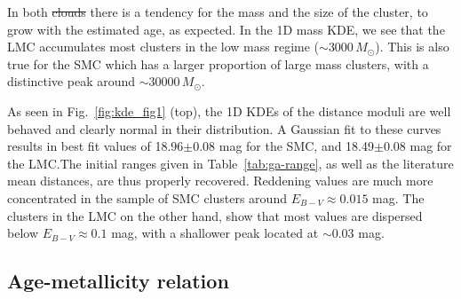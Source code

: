 \documentclass[draft]{aa}
\providecommand{\DIFaddtex}[1]{{\protect\color{blue}\uwave{#1}}} %
\providecommand{\DIFdeltex}[1]{{\protect\color{red}\sout{#1}}}                      %
\providecommand{\DIFaddbegin}{} %
\providecommand{\DIFaddend}{} %
\providecommand{\DIFdelbegin}{} %
\providecommand{\DIFdelend}{} %
\providecommand{\DIFadd}[1]{\texorpdfstring{\DIFaddtex{#1}}{#1}} %
\providecommand{\DIFdel}[1]{\texorpdfstring{\DIFdeltex{#1}}{}} %
\begin{document}
In both \DIFdelbegin \DIFdel{clouds }\DIFdelend \DIFaddbegin \DIFadd{Clouds }\DIFaddend there is a tendency for the mass and the size of the cluster, to
grow with the estimated age, as expected. In the 1D mass KDE, we see that the
LMC accumulates most clusters in the low mass regime (${\sim}3000\,M_{\odot}$).
This is also true for the SMC which has a larger proportion of large mass
clusters, with a distinctive peak around ${\sim}30000\,M_{\odot}$.


As seen in Fig.~\ref{fig:kde_fig1} (top), the 1D KDEs of the distance
moduli are well behaved and clearly normal in their distribution.
A Gaussian fit to these curves results in best fit values of 18.96$\pm$0.08 mag
for the SMC, and 18.49$\pm$0.08 mag for the LMC.\@ The initial ranges given in
Table~\ref{tab:ga-range}, as well as the literature mean distances, are thus
properly recovered.
%
Reddening values are much more concentrated in the sample of SMC clusters
around $E_{B-V}{\approx}0.015$ mag. The clusters in the LMC on the other hand,
show that most values are dispersed below $E_{B-V}{\approx}0.1$ mag, with a
shallower peak located at ${\sim}0.03$ mag.








\subsection{Age-metallicity relation}
\label{ssec:amr}
\end{document}
